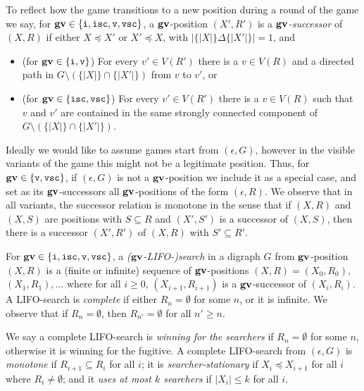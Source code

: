 \documentclass{llncs}
\newcommand{\letters}[1]{\{\!|#1|\!\}}
\newcommand{\var}{\texttt{\bf gv}}
\newcommand{\ivar}{\texttt{i}}
\newcommand{\vvar}{\texttt{v}}
\newcommand{\iscvar}{\texttt{isc}}
\newcommand{\vscvar}{\texttt{vsc}}
\begin{document}
To reflect how the game transitions to a new position during a round of the game we say, for $\var \in \{\ivar,\iscvar,\vvar,\vscvar\}$, a $\var$-position $(X',R')$ is a \emph{$\var$-successor} of $(X,R)$ if
either $X \preceq X'$ or $X' \preceq X$, with $|\letters{X}\Delta\letters{X'}| = 1$, and 
\begin{itemize}
\item (for $\var \in \{\ivar,\vvar\}$) For every $v' \in V(R')$ there is a $v \in V(R)$ and a directed path in $G \setminus (\letters{X} \cap \letters{X'})$ from $v$ to $v'$, or
\item (for $\var \in \{\iscvar,\vscvar\}$) For every $v' \in V(R')$ there is a $v \in V(R)$ such that $v$ and $v'$ are contained in the same strongly connected component of $G \setminus (\letters{X} \cap \letters{X'})$.
\end{itemize}
Ideally we would like to assume games start from $(\epsilon, G)$, however in the visible variants of the game this might not be a legitimate position.  Thus, for $\var \in \{\vvar,\vscvar\}$, if $(\epsilon, G)$ is not a $\var$-position we include it as a special case, and set as its $\var$-successors all $\var$-positions of the form $(\epsilon, R)$.  
We observe that in all variants, the successor relation is monotone in the sense that if $(X,R)$ and $(X,S)$ are positions with $S \subseteq R$ and $(X',S')$ is a successor of $(X,S)$, then there is a successor $(X',R')$ of $(X,R)$ with $S' \subseteq R'$.



For $\var \in \{\ivar,\iscvar,\vvar,\vscvar\}$, a \emph{($\var$-LIFO-)search} in a digraph $G$ from $\var$-position $(X,R)$ is a (finite or infinite) sequence of $\var$-positions $(X,R) =(X_0,R_0),$ $(X_1,R_1),\ldots$ where for all $i \geq 0$, $(X_{i+1},R_{i+1})$ is a $\var$-successor of $(X_i,R_i)$.   A LIFO-search is \emph{complete} if 
either $R_n = \emptyset$ for some $n$, or it is infinite.  We observe that if $R_n = \emptyset$, then $R_{n'} = \emptyset$ for all $n' \geq n$. 

We say a complete LIFO-search is \emph{winning for the searchers} if $R_n = \emptyset$ for some $n$, otherwise it is winning for the fugitive.   A complete LIFO-search from $(\epsilon, G)$ is \emph{monotone} if $R_{i+1} \subseteq R_i$ for all $i$; it is \emph{searcher-stationary} if $X_{i} \preceq X_{i+1}$ for all $i$ where $R_i \neq \emptyset$; and it \emph{uses at most $k$ searchers} if $|X_i| \leq k$ for all $i$.  
\end{document}
